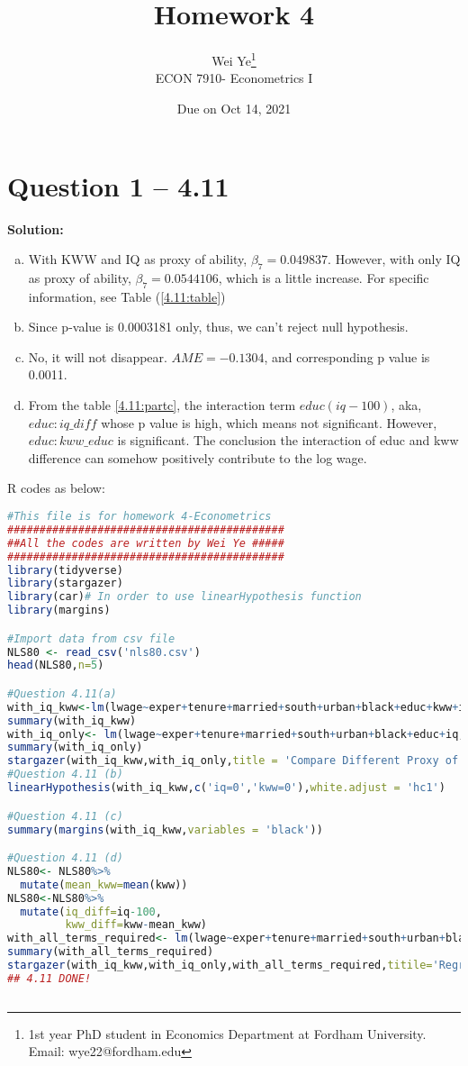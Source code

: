 \documentclass[11pt]{article} %
\title{Homework 4}
\author{Wei Ye\footnote{ 1st year PhD student in Economics Department at Fordham University. Email: wye22@fordham.edu}
    \\ ECON 7910- Econometrics I}
\date{Due on Oct 14, 2021}
\begin{document}
\maketitle

\section{Question 1 -- 4.11}
\textbf{Solution:}
\begin{enumerate}[a)]
	\item With KWW and IQ as proxy of ability, $\beta_7=0.049837$. However, with only IQ as proxy of ability, $\beta_7=0.0544106$, which is a little increase. For specific information, see Table (\ref{4.11:table})
	\item Since p-value is 0.0003181 only, thus, we can't reject null hypothesis.
	\item No, it will not disappear. $AME=-0.1304$, and corresponding p value is 0.0011.
	\item From the table \ref{4.11:partc}, the interaction term $educ(iq-100)$, aka, $educ:iq\_diff$ whose p value is high, which means not significant. However, $educ:kww\_educ$ is significant. The conclusion the interaction of educ and kww difference can somehow positively contribute to the log wage. 
\end{enumerate}
R codes as below: 
\begin{lstlisting}[language=R]
	#This file is for homework 4-Econometrics
###########################################
##All the codes are written by Wei Ye #####
###########################################
library(tidyverse)
library(stargazer)
library(car)# In order to use linearHypothesis function
library(margins)

#Import data from csv file
NLS80 <- read_csv('nls80.csv')
head(NLS80,n=5)

#Question 4.11(a)
with_iq_kww<-lm(lwage~exper+tenure+married+south+urban+black+educ+kww+iq,data=NLS80)
summary(with_iq_kww)
with_iq_only<- lm(lwage~exper+tenure+married+south+urban+black+educ+iq,data=NLS80)
summary(with_iq_only)
stargazer(with_iq_kww,with_iq_only,title = 'Compare Different Proxy of Ability in 4.11')
#Question 4.11 (b)
linearHypothesis(with_iq_kww,c('iq=0','kww=0'),white.adjust = 'hc1')

#Question 4.11 (c)
summary(margins(with_iq_kww,variables = 'black'))

#Question 4.11 (d)
NLS80<- NLS80%>%
  mutate(mean_kww=mean(kww))
NLS80<-NLS80%>%
  mutate(iq_diff=iq-100,
         kww_diff=kww-mean_kww)
with_all_terms_required<- lm(lwage~exper+tenure+married+south+urban+black+educ+kww+iq+educ:iq_diff+educ:kww_diff,data=NLS80)
summary(with_all_terms_required)
stargazer(with_iq_kww,with_iq_only,with_all_terms_required,titile='Regression table for 4.11 (c)')
## 4.11 DONE!
	
\end{lstlisting}
\end{document}
